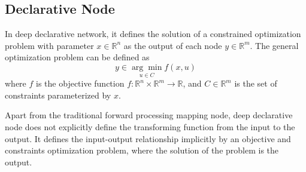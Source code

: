 \subsection{Declarative Node}
In deep declarative network, it defines the solution of a constrained optimization problem with parameter $x \in \mathbb{R}^n$ as the output of each node $y \in \mathbb{R}^m$. The general optimization problem can be defined as 
\begin{equation}
    \label{equ:ddn-basic}
    y \in \underset{u \in C}{\arg \min } f(x, u)
\end{equation}
where $f$ is the objective function $f: \mathbb{R}^n \times \mathbb{R}^m \rightarrow \mathbb{R}$, and $C \in \mathbb{R}^m$ is the set of constraints parameterized by $x$. 
\par Apart from the traditional forward processing mapping node, deep declarative node does not explicitly define the transforming function from the input to the output. It defines the input-output relationship implicitly by an objective and constraints optimization problem, where the solution of the problem is the output. 
